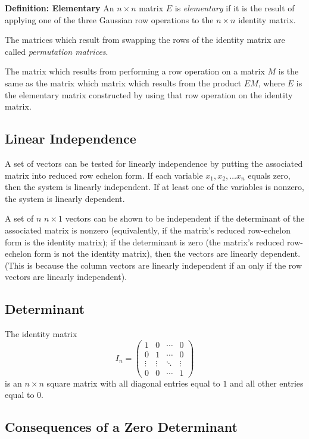 \textbf{Definition: Elementary} An $n\times n$ matrix $E$ is \textit{elementary} if it is the result of applying one of the three Gaussian row operations to the $n\times n$ identity matrix.

The matrices which result from swapping the rows of the identity matrix are called \textit{permutation matrices}.

The matrix which results from performing a row operation on a matrix $M$ is the same as the matrix which matrix which results from the product $EM$, where $E$ is the elementary matrix constructed by using that row operation on the identity matrix.


\subsection{Linear Independence}

A set of vectors can be tested for linearly independence by putting the associated matrix into reduced row echelon form. If each variable $x_{1}, x_{2},\ldots x_{n}$ equals zero, then the system is linearly independent. If at least one of the variables is nonzero, the system is linearly dependent.

A set of $n$ $n \times 1$ vectors can be shown to be independent if the determinant of the associated matrix is nonzero (equivalently, if the matrix's reduced row-echelon form is the identity matrix); if the determinant is zero (the matrix's reduced row-echelon form is not the identity matrix), then the vectors are linearly dependent. (This is because the column vectors are linearly independent if an only if the row vectors are linearly independent).

\subsection{Determinant}

The identity matrix $$I_{n} =
\begin{pmatrix}
1      & 0      & \cdots & 0     \\
0      & 1      & \cdots & 0     \\
\vdots & \vdots & \ddots & \vdots\\
0      & 0      & \cdots & 1

\end{pmatrix}$$ is an $n \times n$ square matrix with all diagonal entries equal to $1$ and all other entries equal to $0$.

\subsection{Consequences of a Zero Determinant}



